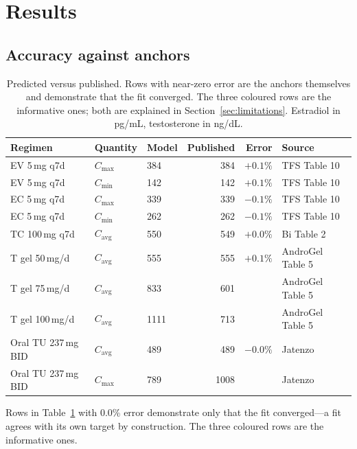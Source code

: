 \documentclass[11pt,a4paper]{article}
\newcommand{\bad}[1]{\obs{#1}}
\newcommand{\good}[1]{#1}
\begin{document}
\section{Results}
\label{sec:results}

\subsection{Accuracy against anchors}
\label{sec:accuracy}

\begin{table}[h]
\centering
\small
\begin{tabular}{@{}lllrrl@{}}
\toprule
\textbf{Regimen} & \textbf{Quantity} & \textbf{Model} & \textbf{Published}
                 & \textbf{Error} & \textbf{Source} \\
\midrule
EV 5\,mg q7d & $C_{\max}$ & 384 & 384 & \good{$+0.1\%$} & TFS Table 10 \\
EV 5\,mg q7d & $C_{\min}$ & 142 & 142 & \good{$+0.1\%$} & TFS Table 10 \\
EC 5\,mg q7d & $C_{\max}$ & 339 & 339 & \good{$-0.1\%$} & TFS Table 10 \\
EC 5\,mg q7d & $C_{\min}$ & 262 & 262 & \good{$-0.1\%$} & TFS Table 10 \\
TC 100\,mg q7d & $C_{\mathrm{avg}}$ & 550 & 549 & \good{$+0.0\%$} & Bi Table 2 \\
T gel 50\,mg/d & $C_{\mathrm{avg}}$ & 555 & 555 & \good{$+0.1\%$} & AndroGel Table 5 \\
T gel 75\,mg/d & $C_{\mathrm{avg}}$ & 833 & 601 & \bad{$+38.6\%$} & AndroGel Table 5 \\
T gel 100\,mg/d & $C_{\mathrm{avg}}$ & 1111 & 713 & \bad{$+55.8\%$} & AndroGel Table 5 \\
Oral TU 237\,mg BID & $C_{\mathrm{avg}}$ & 489 & 489 & \good{$-0.0\%$} & Jatenzo \\
Oral TU 237\,mg BID & $C_{\max}$ & 789 & 1008 & \bad{$-21.7\%$} & Jatenzo \\
\bottomrule
\end{tabular}
\caption{Predicted versus published. Rows with near-zero error are the
anchors themselves and demonstrate that the fit converged. The three
coloured rows are the informative ones; both are explained in
Section~\ref{sec:limitations}. Estradiol in pg/mL, testosterone in
ng/dL.}
\label{tab:accuracy}
\end{table}

Rows in Table~\ref{tab:accuracy} with 0.0\% error demonstrate only that
the fit converged---a fit agrees with its own target by construction.
The three coloured rows are the informative ones.
\end{document}
